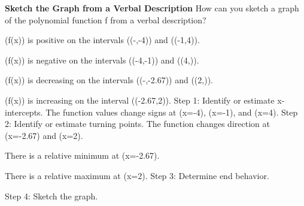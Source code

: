 \documentclass{article}
\newenvironment{example}[1]{}{}         %
\newcommand{\answer}[1]{}               %
\newcommand{\placeholder}[2]{}          %
\newcommand{\te}[1]{}                   %
\begin{document}
\begin{example}{4}
\textbf{Sketch the Graph from a Verbal Description}
How can you sketch a graph of the polynomial function f from a verbal description?
\item (f(x)) is positive on the intervals ((-\infty,-4)) and ((-1,4)).
\item (f(x)) is negative on the intervals ((-4,-1)) and ((4,\infty)).
\item (f(x)) is decreasing on the intervals ((-\infty,-2.67)) and ((2,\infty)).
\item (f(x)) is increasing on the interval ((-2.67,2)).
Step 1: Identify or estimate x-intercepts. The function values change signs at (x=-4), (x=-1), and (x=4).
Step 2: Identify or estimate turning points. The function changes direction at (x=-2.67) and (x=2).
\item There is a relative minimum at (x=-2.67).
\item There is a relative maximum at (x=2).
Step 3: Determine end behavior.
\placeholder{graph}{End-behavior schematic: arrowed unnumbered x,y axes, no grid. Two disconnected red descending diagonal strokes, one in quadrant II with arrow toward upper left, one in quadrant IV with arrow toward lower right; central region blank. Callouts identify decreasing on (-infinity,-2.67) at left and (2,infinity) at right.}
\te{Callouts: (f(x)) is decreasing on the interval ((-\infty,-2.67)). This model is empty in the middle because a variety of key features occur here. This is to emphasize only what happens with the end behavior, that is as (x\to\pm\infty). (f(x)) is decreasing on the interval ((2,\infty)).}
Step 4: Sketch the graph.
\placeholder{graph}{Red cubic-shaped sketch on pale blue grid, x-axis labels -4,-2,O,2,4, unit horizontal grid; y-axis unnumbered with arrowheads. Labeled filled intercepts (-4,0),(-1,0),(4,0), filled minimum near x=-2.67 just below x-axis and filled maximum at x=2 above x-axis. Left end up, right end down, arrowed. Visible x interval approximately [-6,6], no numerical y scale.}
\answer{See graph: x-intercepts -4,-1,4; relative minimum at x=-2.67; relative maximum at x=2; left end up, right end down.}
\te{Callout: The y-axis does not show any scale because you only know general function behavior, not specific values.}
\te{COMMON ERROR Positive/negative intervals tell only where the function's graph lies above or below the x-axis. It does not indicate whether the function is increasing or decreasing.}
\end{example}
\end{document}
